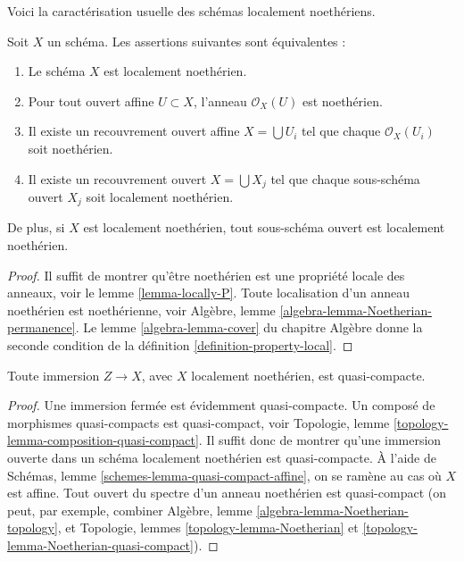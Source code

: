 \noindent
Voici la caractérisation usuelle des schémas localement noethériens.

\begin{lemma}
\label{lemma-locally-Noetherian}
Soit $X$ un schéma. Les assertions suivantes sont équivalentes :
\begin{enumerate}
\item Le schéma $X$ est localement noethérien.
\item Pour tout ouvert affine $U \subset X$, l'anneau $\mathcal{O}_X(U)$
est noethérien.
\item Il existe un recouvrement ouvert affine $X = \bigcup U_i$ tel que
chaque $\mathcal{O}_X(U_i)$ soit noethérien.
\item Il existe un recouvrement ouvert $X = \bigcup X_j$
tel que chaque sous-schéma ouvert $X_j$ soit localement noethérien.
\end{enumerate}
De plus, si $X$ est localement noethérien, tout sous-schéma ouvert
est localement noethérien.
\end{lemma}

\begin{proof}
Il suffit de montrer qu'être noethérien est une propriété locale
des anneaux, voir le lemme \ref{lemma-locally-P}.
Toute localisation d'un anneau noethérien est noethérienne,
voir Algèbre, lemme \ref{algebra-lemma-Noetherian-permanence}.
Le lemme \ref{algebra-lemma-cover} du chapitre Algèbre donne
la seconde condition de la définition \ref{definition-property-local}.
\end{proof}

\begin{lemma}
\label{lemma-immersion-into-noetherian}
Toute immersion $Z \to X$, avec $X$ localement noethérien, est quasi-compacte.
\end{lemma}

\begin{proof}
Une immersion fermée est évidemment
quasi-compacte. Un composé de morphismes quasi-compacts est quasi-compact,
voir Topologie, lemme \ref{topology-lemma-composition-quasi-compact}.
Il suffit donc de montrer qu'une immersion ouverte dans un
schéma localement noethérien est quasi-compacte. À
l'aide de Schémas, lemme \ref{schemes-lemma-quasi-compact-affine},
on se ramène au cas où $X$ est affine.
Tout ouvert du spectre d'un anneau noethérien est
quasi-compact (on peut, par exemple,
combiner Algèbre, lemme \ref{algebra-lemma-Noetherian-topology},
et Topologie, lemmes \ref{topology-lemma-Noetherian} et
\ref{topology-lemma-Noetherian-quasi-compact}).
\end{proof}

